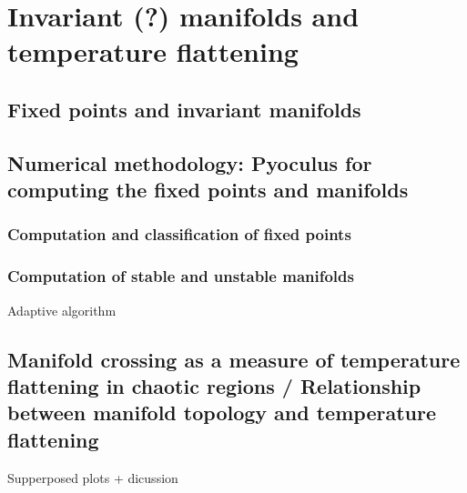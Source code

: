 \section{Invariant (?) manifolds and temperature flattening}
\subsection{Fixed points and invariant manifolds}
\subsection{Numerical methodology: Pyoculus for computing the fixed points and manifolds}
\subsubsection{Computation and classification of fixed points}
\subsubsection{Computation of stable and unstable manifolds}
Adaptive algorithm
\subsection{Manifold crossing as a measure of temperature flattening in chaotic regions / Relationship between manifold topology and temperature flattening}
Supperposed plots + dicussion